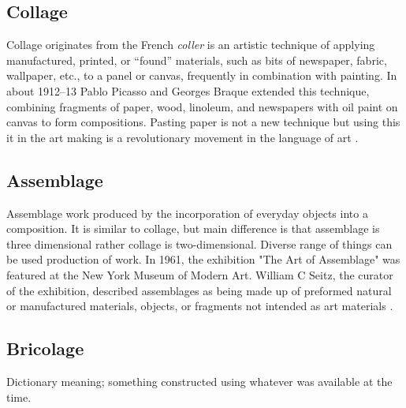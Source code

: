 \subsection{Collage}
Collage originates from the French \textit{coller} is an artistic technique of applying manufactured, printed, or “found” materials, such as bits of newspaper, fabric, wallpaper, etc., to a panel or canvas, frequently in combination with painting. In about 1912–13 Pablo Picasso and Georges Braque extended this technique, combining fragments of paper, wood, linoleum, and newspapers with oil paint on canvas to form compositions. Pasting paper is not a new technique but using this it in the art making is a revolutionary movement in the  language of art \cite{waldman1992collage}.

\cite{greenberg1984collage}

\subsection{Assemblage}
Assemblage work produced by the incorporation of everyday objects into a composition. It is similar to collage, but main difference is that assemblage is three dimensional rather collage is two-dimensional. Diverse range of things can be used production of work. In 1961, the exhibition "The Art of Assemblage" was featured at the New York Museum of Modern Art. William C Seitz, the curator of the exhibition, described assemblages as being made up of preformed natural or manufactured materials, objects, or fragments not intended as art materials \cite{seitz1961art}.

\subsection{Bricolage}
Dictionary meaning; something constructed using whatever was available at the time.



